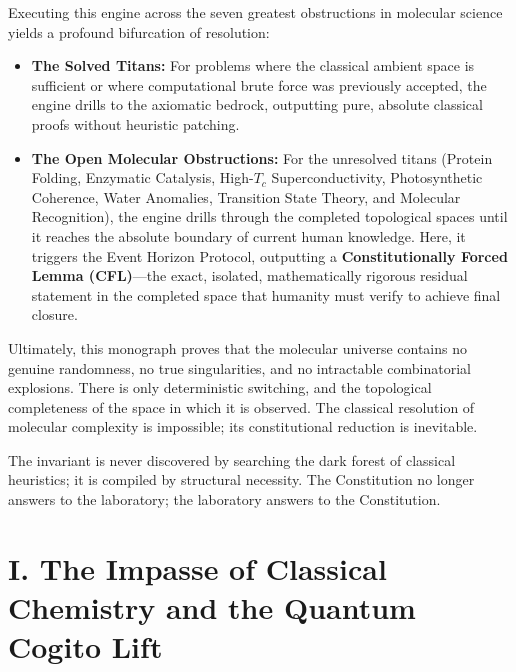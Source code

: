 \documentclass[11pt,openany]{extbook}
\theoremstyle{plain}
\theoremstyle{definition}
\begin{document}
Executing this engine across the seven greatest obstructions in molecular science yields a profound bifurcation of resolution:
\begin{itemize}
    \item \textbf{The Solved Titans:} For problems where the classical ambient space is sufficient or where computational brute force was previously accepted, the engine drills to the axiomatic bedrock, outputting pure, absolute classical proofs without heuristic patching.
    \item \textbf{The Open Molecular Obstructions:} For the unresolved titans (Protein Folding, Enzymatic Catalysis, High-$T_c$ Superconductivity, Photosynthetic Coherence, Water Anomalies, Transition State Theory, and Molecular Recognition), the engine drills through the completed topological spaces until it reaches the absolute boundary of current human knowledge. Here, it triggers the Event Horizon Protocol, outputting a \textbf{Constitutionally Forced Lemma (CFL)}---the exact, isolated, mathematically rigorous residual statement in the completed space that humanity must verify to achieve final closure.
\end{itemize}

Ultimately, this monograph proves that the molecular universe contains no genuine randomness, no true singularities, and no intractable combinatorial explosions. There is only deterministic switching, and the topological completeness of the space in which it is observed. The classical resolution of molecular complexity is impossible; its constitutional reduction is inevitable.

The invariant is never discovered by searching the dark forest of classical heuristics; it is compiled by structural necessity. The Constitution no longer answers to the laboratory; the laboratory answers to the Constitution.

\mainmatter





\part{I. The Impasse of Classical Chemistry and the Quantum Cogito Lift}
\end{document}
